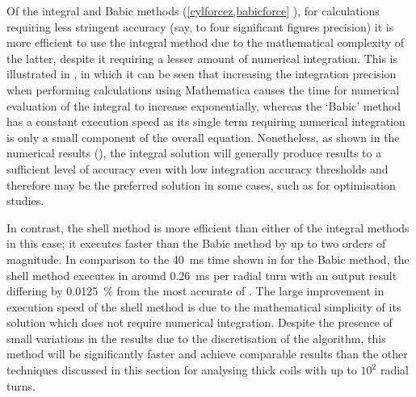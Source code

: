 \documentclass[11pt,a4paper]{memoir}
\begin{document}
Of the integral and Babic methods (\eqref{cylforcez,babicforce} \resp), for calculations requiring less stringent accuracy (say, to four significant figures precision) it is more efficient to use the integral method due to the mathematical complexity of the latter, despite it requiring a lesser amount of numerical integration.
This is illustrated in , in which it can be seen that increasing the integration precision when performing calculations using Mathematica causes the time for numerical evaluation of the integral to increase exponentially, whereas the `Babic' method has a constant execution speed as its single term requiring numerical integration is only a small component of the overall equation.
Nonetheless, as shown in the numerical results (), the integral solution will generally produce results to a sufficient level of accuracy even with low integration accuracy thresholds and therefore may be the preferred solution in some cases, such as for optimisation studies.

In contrast, the shell method is more efficient than either of the integral methods in this case; it executes faster than the Babic method by up to two orders of magnitude.
In comparison to the \SI{40}{ms} time shown in  for the Babic method, the shell method executes in around \SI{0.26}{ms} per radial turn with an output result differing by \SI{0.0125}{\%} from the most accurate of .
The large improvement in execution speed of the shell method is due to the mathematical simplicity of its solution which does not require numerical integration.
Despite the presence of small variations in the results due to the discretisation of the algorithm, this method will be significantly faster and achieve comparable results than the other techniques discussed in this section for analysing thick coils with up to $10^2$ radial turns.

\begin{figure}
\centering
{}
\end{figure}
\end{document}
